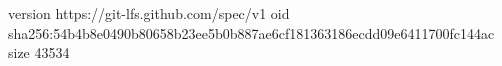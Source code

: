 version https://git-lfs.github.com/spec/v1
oid sha256:54b4b8e0490b80658b23ee5b0b887ae6cf181363186ecdd09e6411700fc144ac
size 43534
